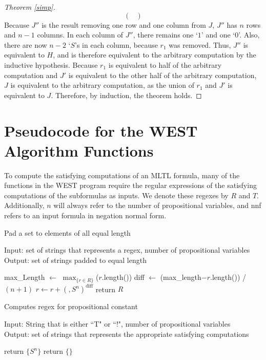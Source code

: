 \documentclass[runningheads]{llncs}
\begin{document}
\begin{proof}[Theorem \ref{simp}]
\[\begin{pmatrix}
  \end{pmatrix}
\]
Because $J''$ is the result removing one row and one column from $J$, $J''$ has $n$ rows and $n-1$ columns. In each column of $J''$, there remains one `$1$' and one `$0$'. Also, there are now $n-2$ `$S$'s in each column, because $r_1$ was removed. Thus, $J''$ is equivalent to $H$, and is therefore equivalent to the arbitrary computation by the inductive hypothesis.
Because $r_1$ is equivalent to half of the arbitrary computation and $J'$ is equivalent to the other half of the arbitrary computation, $J$ is equivalent to the arbitrary computation, as the union of $r_1$ and $J'$ is equivalent to $J$.
Therefore, by induction, the theorem holds.
\end{proof}
\section{Pseudocode for the WEST Algorithm Functions} \label{pseudocode appendix}
To compute the satisfying computations of an MLTL formula, many of the functions in the WEST program require the regular expressions of the satisfying computations of the subformulas as inputs. We denote these regexes by $R$ and $T$. Additionally, $n$ will always refer to the number of propositional variables, and nnf refers to an input formula in negation normal form.
\begin{algorithm}[H]
\caption{Pad a set to elements of all equal length}
Input: set of strings that represents a regex, number of propositional variables \\
Output: set of strings padded to equal length
\begin{algorithmic}
    \State max\_Length $\leftarrow$ $\max_{\{r \in R\}}$($r$.length())
        \State diff $\leftarrow$ (max\_length$- r$.length()) / $(n+1)$ 
        \State  $r \leftarrow r + (,S^n)^{\text{diff}}$
    \EndFor
    \State return $R$
    
\EndProcedure
\end{algorithmic}
\end{algorithm}
\begin{algorithm}[H]
\caption{Computes regex for propositional constant}
Input: String that is either ``T" or ``!", number of propositional variables\\
Output: set of strings that represents the appropriate satisfying computations
\begin{algorithmic}
     return $\{S^n\}$
    \Else \hspace{1mm} return $\{\}$ 
    \EndIf
\EndProcedure
\end{algorithmic}
\end{algorithm}
\end{document}
